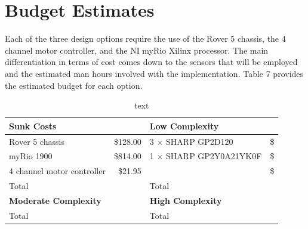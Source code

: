 \documentclass[a4paper]{article}
\begin{document}
\section{Budget Estimates}
Each of the three design options require the use of the Rover 5 chassis, the 4 channel motor controller, and the NI myRio Xilinx processor. The main differentiation in terms of cost comes down to the sensors that will be employed and the estimated man hours involved with the implementation. Table 7 provides the estimated budget for each option.
\begin{table}[h]
\centering
\caption{text}
\begin{tabular}{p{6cm}rp{6cm}r}
\toprule
\textbf{Sunk Costs} & & \textbf{Low Complexity} & \\
\midrule
Rover 5 chassis & \$128.00 & 3 $\times$ SHARP GP2D120 & \$ \\
myRio 1900 & \$814.00 & 1 $\times$ SHARP GP2Y0A21YK0F & \$ \\
4 channel motor controller & \$21.95 &  & \$ \\
\midrule
Total & & Total & \\
\midrule
\midrule
\textbf{Moderate Complexity} & & \textbf{High Complexity} & \\
\midrule
\midrule
Total & & Total & \\
\bottomrule
\end{tabular}
\end{table}

\end{document}
